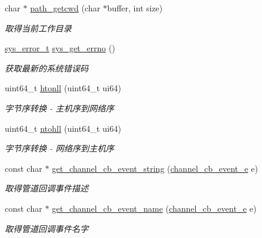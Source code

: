 \begin{DoxyCompactItemize}
char $\ast$ \hyperlink{a00082_a6c98a04f00772c05a1f51afc185f7513_a6c98a04f00772c05a1f51afc185f7513}{path\+\_\+getcwd} (char $\ast$buffer, int size)
\begin{DoxyCompactList}\small\item\em 取得当前工作目录 \end{DoxyCompactList}\item 
\hyperlink{a00051_aeaea39e7ef5adeec1efaee3eee6b12ff_aeaea39e7ef5adeec1efaee3eee6b12ff}{sys\+\_\+error\+\_\+t} \hyperlink{a00082_a2e3ede072c59452900afcb1334611dac_a2e3ede072c59452900afcb1334611dac}{sys\+\_\+get\+\_\+errno} ()
\begin{DoxyCompactList}\small\item\em 获取最新的系统错误码 \end{DoxyCompactList}\item 
uint64\+\_\+t \hyperlink{a00082_ab1f59aa518d342661072356abbbb5e85_ab1f59aa518d342661072356abbbb5e85}{htonll} (uint64\+\_\+t ui64)
\begin{DoxyCompactList}\small\item\em 字节序转换 -\/ 主机序到网络序 \end{DoxyCompactList}\item 
uint64\+\_\+t \hyperlink{a00082_aebdeac120dd80e9450e54e6f18151f45_aebdeac120dd80e9450e54e6f18151f45}{ntohll} (uint64\+\_\+t ui64)
\begin{DoxyCompactList}\small\item\em 字节序转换 -\/ 网络序到主机序 \end{DoxyCompactList}\item 
const char $\ast$ \hyperlink{a00082_a09544f6ae0ab9ff277146fb25ae2354c_a09544f6ae0ab9ff277146fb25ae2354c}{get\+\_\+channel\+\_\+cb\+\_\+event\+\_\+string} (\hyperlink{a00051_aaf2cba5d4035f3d56350b59342ebf65c_aaf2cba5d4035f3d56350b59342ebf65c}{channel\+\_\+cb\+\_\+event\+\_\+e} e)
\begin{DoxyCompactList}\small\item\em 取得管道回调事件描述 \end{DoxyCompactList}\item 
const char $\ast$ \hyperlink{a00082_a83ecacb2855b2a9c324de5ffb5300e15_a83ecacb2855b2a9c324de5ffb5300e15}{get\+\_\+channel\+\_\+cb\+\_\+event\+\_\+name} (\hyperlink{a00051_aaf2cba5d4035f3d56350b59342ebf65c_aaf2cba5d4035f3d56350b59342ebf65c}{channel\+\_\+cb\+\_\+event\+\_\+e} e)
\begin{DoxyCompactList}\small\item\em 取得管道回调事件名字 \end{DoxyCompactList}\item 

\end{DoxyCompactItemize}
